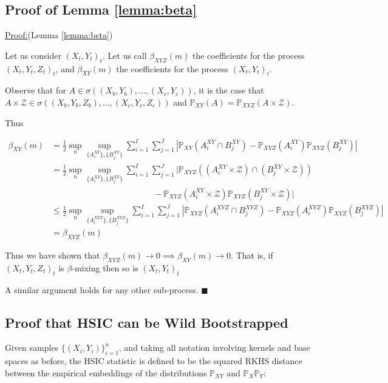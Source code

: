 \documentclass[]{article}
\newenvironment{claimproof}[1]{\par\noindent\underline{Proof:}\space#1}{\hfill $\blacksquare$}
\begin{document}
\subsection{Proof of Lemma \ref{lemma:beta}}

\begin{claimproof}(Lemma \ref{lemma:beta}) 

Let us consider $(X_t,Y_t)_t$.
Let us call $\beta_{XYZ}(m)$ the coefficients for the process $(X_t,Y_t,Z_t)_t$, and $\beta_{XY}(m)$ the coefficients for the process $(X_t,Y_t)_t$. 

Observe that for $A \in \sigma((X_b,Y_b),\ldots, (X_c,Y_c))$, it is the case that $A \times \mathcal{Z} \in \sigma((X_b,Y_b,Z_b),\ldots, (X_c,Y_c,Z_c))$ and $\mathbb{P}_{XY}(A) = \mathbb{P}_{XYZ}(A\times \mathcal{Z})$.

Thus

\begin{align*}
\beta_{XY}(m) &= \frac{1}{2} \sup_n \sup_{ \{A_i^{XY} \}, \{B_j^{XY} \} } \sum_{i=1}^I \sum_{j=1}^J | \mathbb{P}_{XY}(A_i^{XY} \cap B_j^{XY}) - \mathbb{P}_{XYZ}(A_i^{XY})\mathbb{P}_{XYZ}(B_j^{XY})| \\
&= \frac{1}{2} \sup_n \sup_{ \{A_i^{XY} \}, \{B_j^{XY} \} } \sum_{i=1}^I \sum_{j=1}^J | \mathbb{P}_{XYZ}((A_i^{XY}\times \mathcal{Z}) \cap (B_j^{XY} \times \mathcal{Z})) \\& \quad \quad\quad \quad \quad \quad\quad \quad \quad \quad\quad \quad- \mathbb{P}_{XYZ}(A_i^{XY}\times \mathcal{Z})\mathbb{P}_{XYZ}(B_j^{XY} \times \mathcal{Z})| \\
& \leq \frac{1}{2} \sup_n \sup_{ \{A_i^{XYZ} \}, \{B_j^{XYZ} \} } \sum_{i=1}^I \sum_{j=1}^J | \mathbb{P}_{XYZ}(A_i^{XYZ} \cap B_j^{XYZ}) - \mathbb{P}_{XYZ}(A_i^{XYZ})\mathbb{P}_{XYZ}(B_j^{XYZ})| \\
& = \beta_{XYZ}(m)
\end{align*}

Thus we have shown that  $\beta_{XYZ}(m) \longrightarrow 0 \implies \beta_{XY}(m) \longrightarrow 0$. That is, if  $(X_t,Y_t,Z_t)_t$ is $\beta$-mixing then so is  $(X_t,Y_t)_t$ 

A similar argument holds for any other sub-process.
\end{claimproof}

\subsection{Proof that HSIC can be Wild Bootstrapped}

Given samples $\{(X_i,Y_i)\}_{i=1}^n$, and taking all notation involving kernels and base spaces as before, the HSIC statistic is defined to be the squared RKHS distance between the empirical embeddings of the distributions $\mathbb{P}_{XY}$ and $\mathbb{P}_X\mathbb{P}_Y$:
\end{document}
